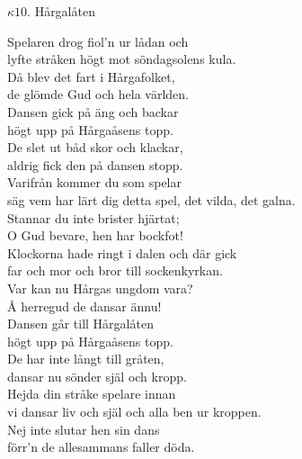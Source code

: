 \documentclass[a6paper,10pt]{article}
\begin{document}
\setlength{\oddsidemargin}{-0.47in}
\noindent
\begin{center}
\Large $\kappa10$. Hårgalåten\\ 
\end{center}
Spelaren drog fiol'n ur lådan och\\
lyfte stråken högt mot söndagsolens kula.\\
Då blev det fart i Hårgafolket,\\
de glömde Gud och hela världen.
\vspace{5pt}\\
Dansen gick på äng och backar\\
högt upp på Hårgaåsens topp.\\
De slet ut båd skor och klackar,\\
aldrig fick den på dansen stopp.
\vspace{5pt}\\
Varifrån kommer du som spelar\\
säg vem har lärt dig detta spel, det vilda, det galna.\\
Stannar du inte brister hjärtat;\\
O Gud bevare, hen har bockfot!
\vspace{5pt}\\
Klockorna hade ringt i dalen och där gick\\
far och mor och bror till sockenkyrkan.\\
Var kan nu Hårgas ungdom vara?\\
Å herregud de dansar ännu!
\vspace{5pt}\\
Dansen går till Hårgalåten\\
högt upp på Hårgaåsens topp.\\
De har inte långt till gråten,\\
dansar nu sönder själ och kropp.
\vspace{5pt}\\
Hejda din stråke spelare innan \\
vi dansar liv och själ och alla ben ur kroppen.\\
Nej inte slutar hen sin dans \\
förr'n de allesammans faller döda.
\end{document}
